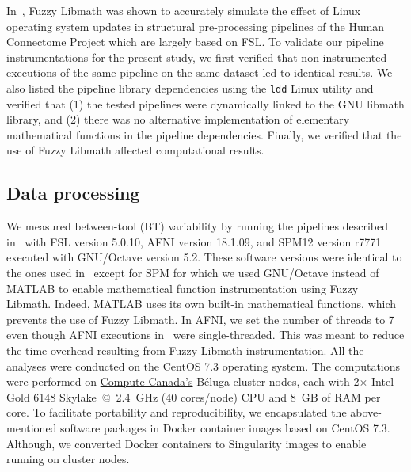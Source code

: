 \documentclass[11pt,onecolumn]{article}
\begin{document}
In~\cite{salari2021accurate}, Fuzzy Libmath was shown to accurately
simulate the effect of Linux operating system updates in structural
pre-processing pipelines of the Human Connectome Project which are largely based on FSL.
To validate our pipeline instrumentations for the present study, we first verified that non-instrumented
executions of the same pipeline on the same dataset led to identical
results. We also listed the pipeline
library dependencies using the \texttt{ldd} Linux utility and verified that
(1) the tested pipelines were dynamically linked to the GNU libmath library, and
(2) there was no alternative implementation of elementary mathematical functions in the pipeline dependencies.
Finally, we verified that the use of Fuzzy Libmath affected computational results.

\subsection{Data processing}

We measured between-tool (BT) variability by running the pipelines
described in~\cite{bowring2019exploring} with FSL version 5.0.10, AFNI
version 18.1.09, and SPM12 version r7771 executed with GNU/Octave version
5.2. These software versions were identical to the ones used 
in~\cite{bowring2019exploring} except for SPM for which we used GNU/Octave
instead of MATLAB to enable mathematical function instrumentation using
Fuzzy Libmath. Indeed, MATLAB uses its own built-in mathematical functions,
which prevents the use of Fuzzy Libmath. In AFNI, we set the number of
threads to 7 even though AFNI executions
in~\cite{bowring2019exploring} were single-threaded. This was meant to
reduce the time overhead resulting from Fuzzy Libmath instrumentation.
All the analyses were conducted on the CentOS 7.3 operating system. The
computations were performed on \href{https://www.computecanada.ca}{Compute
  Canada's} Béluga cluster nodes, each with 2$\times$ Intel Gold 6148 Skylake~@~2.4~GHz
(40 cores/node) CPU and 8~GB of RAM per core. To facilitate portability and reproducibility,
we encapsulated the
above-mentioned software packages in Docker container images based on CentOS 7.3.
Although, we converted Docker containers to Singularity images to enable running on cluster nodes.
\end{document}
